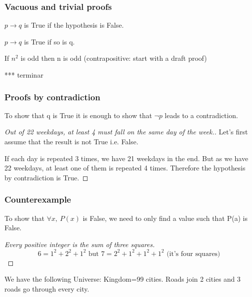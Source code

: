 \documentclass[12pt, a4paper]{book}
\begin{document}
\subsubsection*{Vacuous and trivial proofs}
$p \rightarrow q$ is True if the hypothesis is False.

$p \rightarrow q$ is True if so is q.

\begin{exmp}
    If $n^2$ is odd then n is odd (contrapositive: start with a draft proof)

    *** terminar
\end{exmp}

\subsubsection*{Proofs by contradiction}

To show that q is True it is enough to show that $\lnot p$ leads to a contradiction.

\begin{exmp}

    \begin{proof}[Out of 22 weekdays, at least 4 must fall on the same day of the week.]    

    Let's first assume that the result is not True i.e. False. 

    If each day is repeated 3 times, we have 21 weekdays in the end. But as we have 22 weekdays, at least one of them is repeated 4 times. Therefore the hypothesis by contradiction is True.

    \end{proof}
\end{exmp}

\subsubsection*{Counterexample}
To show that $\forall x, \ P(x)$ is False, we need to only find a value such that P(a) is False.

\begin{exmp}
    \begin{proof}[Every positive integer is the sum of three squares]
    $$6=1^2+2^2+1^2 \text{ but } 7= 2^2+1^2+1^2+1^2 \text{ (it's four squares)} $$
    \end{proof}

\end{exmp}

We have the following Universe: Kingdom={99 cities}.
Roads join 2 cities and 3 roads go through every city. 
\end{document}
